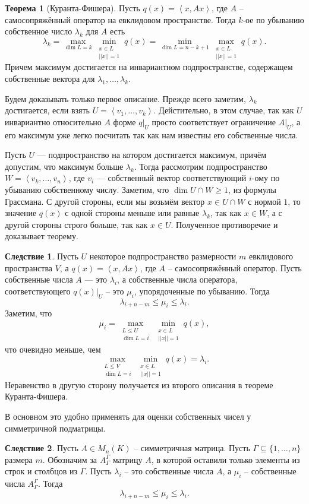 \documentclass[10pt,a4paper,oneside]{book}
\theoremstyle{definition}
\newtheorem{thm}{\color{red!40!black}Теорема}
\newtheorem{cor}{\color{green!45!black}Следствие}
\renewcommand{\leq}{\leqslant}
\renewcommand{\geq}{\geqslant}
\def\lan{\left\langle }
\def\ran{\right\rangle}
\def\thrm{\begin{thm}}
\def\ethrm{\end{thm}}
\def\crl{\begin{cor}}
\def\ecrl{\end{cor}}
\begin{document}
\thrm[Куранта-Фишера] Пусть $q(x)=\lan x, Ax\ran$, где $A$ -- самосопряжённый оператор на евклидовом пространстве. Тогда $k$-ое по убыванию собственное число $\lambda_k$ для $A$ есть 
$$\lambda_k=\max_{\dim L=k} \min_{\substack{ x\in L \\ ||x||=1}} q(x) = \min_{\dim L=n-k+1} \max_{\substack{ x\in L \\ ||x||=1}} q(x).$$
Причем максимум достигается на инвариантном подпространстве, содержащем собственные вектора для $\lambda_1,\dots,\lambda_k$.
\ethrm
\proof Будем доказывать только первое описание. Прежде всего заметим, $\lambda_k$ достигается, если взять $U=\lan v_1,\dots,v_k\ran$. Дейстительно, в этом случае, так как $U$ инвариантно относительно $A$ форме $q|_U$ просто соответствует ограничение $A|_U$, а его максимум уже легко посчитать так как нам известны его собственные числа.

Пусть $U$ --- подпространство на котором достигается максимум, причём допустим, что максимум больше $\lambda_k$. Тогда рассмотрим подпространство $W=\lan v_k,\dots,v_n\ran$, где $v_i$ --- собственный вектор соответствующий $i$-ому по убыванию собственному числу. Заметим, что $\dim U\cap W\geq 1$, из формулы Грассмана. С другой стороны, если мы возьмём вектор $x\in U \cap W$ с нормой $1$, то значение $q(x)$ с одной стороны меньше или равные $\lambda_k$, так как $x\in W$, а с другой стороны строго больше, так как $x\in U$. Полученное противоречие и доказывает теорему.  
\endproof




\crl Пусть $U$ некоторое подпространство размерности $m$ евклидового пространства $V$, а $q(x)=\lan x, Ax\ran$, где $A$ -- самосопряжённый оператор. Пусть собственные числа $A$ --- это $\lambda_i$, а собственные числа оператора, соответствующего $q(x)|_U$ -- это $\mu_i$, упорядоченные по убыванию. Тогда 
$$\lambda_{i+n-m}\leq \mu_i\leq \lambda_i.$$  
\proof Заметим, что
$$\mu_i=\max_{\substack{L\leq U\\ \dim L=i}} \min_{\substack{ x\in L \\ ||x||=1}} q(x),$$
что очевидно меньше, чем 
$$\max_{\substack{L\leq V\\ \dim L=i}} \min_{\substack{ x\in L \\ ||x||=1}} q(x)=\lambda_i.$$
Неравенство в другую сторону получается из второго описания в теореме Куранта-Фишера.
\endproof
\ecrl

В основном это удобно применять для оценки собственных чисел у симметричной подматрицы.

\crl Пусть $A\in M_n(K)$ -- симметричная матрица. Пусть $\Gamma \subseteq \{1,\dots, n\}$ размера $m$. Обозначим за $A^{\Gamma}_{\Gamma}$ матрицу $A$, в которой оставили только элементы из строк и столбцов из $\Gamma$. Пусть $\lambda_i$ -- это собственные числа $A$, а $\mu_i$ -- собственные числа $A^{\Gamma}_{\Gamma}$. Тогда
$$\lambda_{i+n-m}\leq \mu_i\leq \lambda_i.$$
\ecrl 
\end{document}
